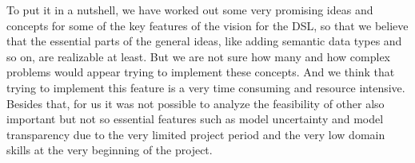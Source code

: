 \par %
To put it in a nutshell, we have worked out some very promising ideas and concepts for some of the key features of the vision for the DSL, so that we believe that the essential parts of the general ideas, like adding semantic data types and so on, are realizable at least. But we are not sure how many and how complex problems would appear trying to implement these concepts. And we think that trying to implement this feature is a very time consuming and resource intensive. Besides that, for us it was not possible to analyze the feasibility of other also important but not so essential features such as model uncertainty and model transparency due to the very limited project period and the very low domain skills at the very beginning of the project.  


